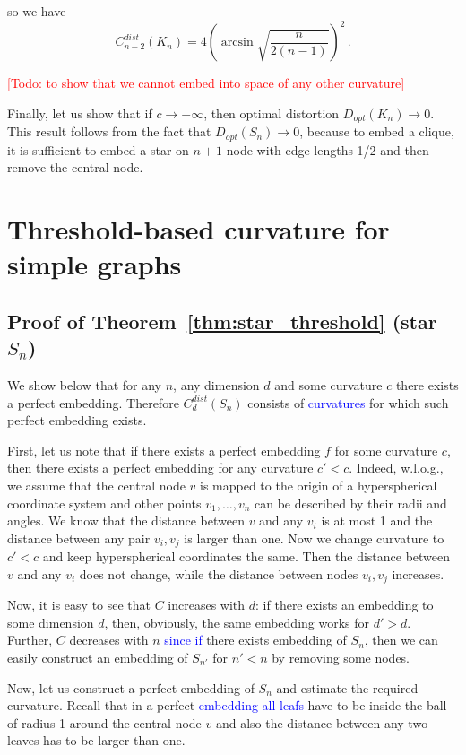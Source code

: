 \documentclass{article} %
\newcommand{\ph}[1]{\textcolor{blue}{#1}}
\begin{document}
so we have
\[
C_{n-2}^{dist}(K_n) = 4 \left(\arcsin \sqrt{\frac{n}{2(n-1)}}\right)^2\,.
\]

\textcolor{red}{[Todo: to show that we cannot embed into space of any other curvature]}

Finally, let us show that if $c \to -\infty$, then optimal distortion $D_{opt}(K_n) \to 0$. This result follows from the fact that $D_{opt}(S_n) \to 0$, because to embed a clique, it is sufficient to embed a star on $n+1$ node with edge lengths 1/2 and then remove the central node. 

\section{Threshold-based curvature for simple graphs}

\subsection{Proof of Theorem~\ref{thm:star_threshold} (star $S_n$)}

We show below that for any $n$, any dimension $d$ and some curvature $c$ there exists a perfect embedding.
Therefore $C_d^{dist}(S_n)$ consists of \ph{curvatures} for which such perfect embedding exists. 

First, let us note that if there exists a perfect embedding $f$ for some curvature $c$, then there exists a perfect embedding for any curvature $c' < c$. Indeed, w.l.o.g., we assume that the central node $v$ is mapped to the origin of a hyperspherical coordinate system and other points $v_1, \ldots, v_n$ can be described by their radii and angles. We know that the distance between $v$ and any $v_i$ is at most 1 and the distance between any pair $v_i, v_j$ is larger than one. Now we change curvature to $c' < c$ and keep hyperspherical coordinates the same. Then the distance between $v$ and any $v_i$ does not change, while the distance between nodes $v_i, v_j$ increases.

Now, it is easy to see that $C$ increases with $d$: if there exists an embedding to some dimension $d$, then, obviously, the same embedding works for $d' > d$. Further, $C$ decreases with $n$ \ph{since if} there exists embedding of $S_n$, then we can easily construct an embedding of $S_{n'}$ for $n' < n$ by removing some nodes. 

Now, let us construct a perfect embedding of $S_n$
and estimate the required curvature.
Recall that in a perfect \ph{embedding all leafs} have to be inside the ball of radius 1 around the central node $v$ and also the distance between any two leaves has to be larger than one. 
\end{document}
